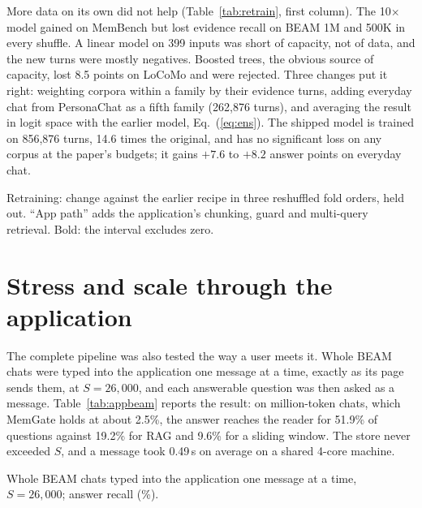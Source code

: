More data on its own did not help (Table~\ref{tab:retrain}, first column). The
10$\times$ model gained on MemBench but lost evidence recall on BEAM 1M and
500K in every shuffle. A linear model on 399 inputs was short of capacity, not
of data, and the new turns were mostly negatives. Boosted trees, the obvious
source of capacity, lost 8.5 points on LoCoMo and were rejected. Three changes
put it right: weighting corpora within a family by their evidence turns,
adding everyday chat from PersonaChat \cite{zhang2018personachat} as a fifth
family (262{,}876 turns), and averaging the result in logit space with the
earlier model, Eq.~(\ref{eq:ens}). The shipped model is trained on 856{,}876
turns, 14.6 times the original, and has no significant loss on any corpus at
the paper's budgets; it gains $+7.6$ to $+8.2$ answer points on everyday chat.

\begin{table}[htbp]
\caption[Retraining: change against the earlier recipe in three reshuffled fold orders, held out.]{Retraining: change against the earlier recipe in three reshuffled
fold orders, held out. ``App path'' adds the application's chunking, guard
and multi-query retrieval. Bold: the interval excludes zero.}
\label{tab:retrain}
\centering
\fontsize{10}{12}\selectfont
\begin{adjustbox}{max width=\textwidth}\end{adjustbox}
\end{table}

\section{Stress and scale through the application}
\label{sec:stress}

The complete pipeline was also tested the way a user meets it. Whole BEAM
chats were typed into the application one message at a time, exactly as its
page sends them, at $S=26{,}000$, and each answerable question was then asked
as a message. Table~\ref{tab:appbeam} reports the result: on million-token
chats, which MemGate holds at about 2.5\%, the answer reaches the reader for
51.9\% of questions against 19.2\% for RAG and 9.6\% for a sliding window. The
store never exceeded $S$, and a message took 0.49\,s on average on a shared
4-core machine.

\begin{table}[htbp]
\caption{Whole BEAM chats typed into the application one message at a time,
$S=26{,}000$; answer recall (\%).}
\label{tab:appbeam}
\centering
\fontsize{10}{12}\selectfont
\begin{adjustbox}{max width=\textwidth}\end{adjustbox}
\end{table}

